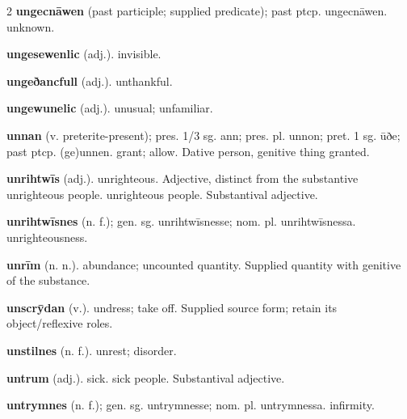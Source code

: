 \begin{multicols*}{2}
\textbf{ungecnāwen} (past participle; supplied predicate); past ptcp. ungecnāwen. unknown.\par
\textbf{ungesewenlic} (adj.). invisible.\par
\textbf{ungeðancfull} (adj.). unthankful.\par
\textbf{ungewunelic} (adj.). unusual; unfamiliar.\par
\textbf{unnan} (v. preterite-present); pres. 1/3 sg. ann; pres. pl. unnon; pret. 1 sg. ūðe; past ptcp. (ge)unnen. grant; allow. Dative person, genitive thing granted.\par
\textbf{unrihtwīs} (adj.). unrighteous. Adjective, distinct from the substantive unrighteous people. unrighteous people. Substantival adjective.\par
\textbf{unrihtwīsnes} (n. f.); gen. sg. unrihtwīsnesse; nom. pl. unrihtwīsnessa. unrighteousness.\par
\textbf{unrīm} (n. n.). abundance; uncounted quantity. Supplied quantity with genitive of the substance.\par
\textbf{unscrȳdan} (v.). undress; take off. Supplied source form; retain its object/reflexive roles.\par
\textbf{unstilnes} (n. f.). unrest; disorder.\par
\textbf{untrum} (adj.). sick. sick people. Substantival adjective.\par
\textbf{untrymnes} (n. f.); gen. sg. untrymnesse; nom. pl. untrymnessa. infirmity.\par

\end{multicols*}
